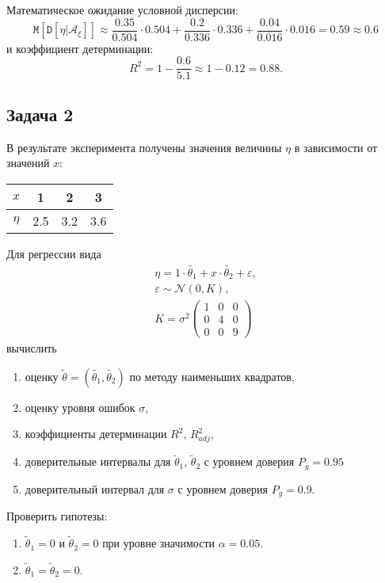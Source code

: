 \documentclass[a4paper,12pt]{article}
\newcommand{\expectation}[1]{\texttt{M} \left[ #1 \right]}
\newcommand{\cvariance}[2]{\texttt{D} \left[ #1 | #2 \right]}
\begin{document}
Математическое ожидание условной дисперсии:
\[
    \expectation{\cvariance{\eta}{\mathcal{A}_\xi}}
    \approx \frac{0.35}{0.504} \cdot 0.504 + \frac{0.2}{0.336} \cdot 0.336 + \frac{0.04}{0.016} \cdot 0.016
    = 0.59
    \approx 0.6
\]
и коэффициент детерминации:
\[
    R^2
    = 1 - \frac{0.6}{5.1}
    \approx 1 - 0.12
    = 0.88 .
\]

\subsection*{Задача 2}

В результате эксперимента получены значения величины $\eta$ в зависимости от значений $x$:

\begin{tabular}{|c|c|c|c|}
    \hline
    $x$    & 1   & 2   & 3   \\
    \hline
    $\eta$ & 2.5 & 3.2 & 3.6 \\
    \hline
\end{tabular}

Для регрессии вида
\begin{gather*}
    \eta = 1 \cdot \widetilde{\theta_1} + x \cdot \widetilde{\theta_2} + \varepsilon , \\
    \varepsilon \sim \mathcal{N}(0, K), \\
    K
    = \sigma^2
    \begin{pmatrix}
        1 & 0 & 0 \\
        0 & 4 & 0 \\
        0 & 0 & 9
    \end{pmatrix}
\end{gather*}
вычислить
\begin{enumerate}
    \item оценку $\widetilde{\theta} = (\widetilde{\theta_1}, \widetilde{\theta_2})$ по методу наименьших квадратов,
    \item оценку уровня ошибок $\sigma$,
    \item коэффициенты детерминации $R^2$, $R_{adj}^2$,
    \item доверительные интервалы для $\widetilde{\theta}_1$, $\widetilde{\theta}_2$ с уровнем доверия $P_g = 0.95$
    \item доверительный интервал для $\sigma$ с уровнем доверия $P_g = 0.9$.
\end{enumerate}

Проверить гипотезы:
\begin{enumerate}
    \item $\widetilde{\theta}_1 = 0$ и $\widetilde{\theta}_2 = 0$ при уровне значимости $\alpha = 0.05$.
    \item $\widetilde{\theta}_1 = \widetilde{\theta}_2 = 0$.
\end{enumerate}
\end{document}
